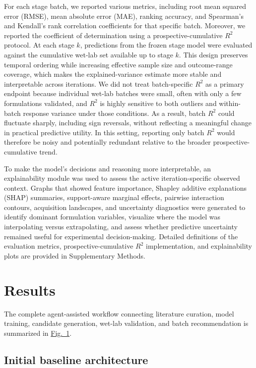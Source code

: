 \documentclass[11pt]{article}
\newcommand{\figref}[2][]{\hyperref[fig:#2]{Fig.~#2#1}}
\begin{document}
For each stage batch, we reported various metrics, including root mean squared error (RMSE), mean absolute error (MAE), ranking accuracy, and Spearman's and Kendall's rank correlation coefficients for that specific batch. Moreover, we reported the coefficient of determination using a prospective-cumulative $R^2$ protocol. At each stage $k$, predictions from the frozen stage model were evaluated against the cumulative wet-lab set available up to stage $k$. This design preserves temporal ordering while increasing effective sample size and outcome-range coverage, which makes the explained-variance estimate more stable and interpretable across iterations. We did not treat batch-specific $R^2$ as a primary endpoint because individual wet-lab batches were small, often with only a few formulations validated, and $R^2$ is highly sensitive to both outliers and within-batch response variance under those conditions. As a result, batch $R^2$ could fluctuate sharply, including sign reversals, without reflecting a meaningful change in practical predictive utility. In this setting, reporting only batch $R^2$ would therefore be noisy and potentially redundant relative to the broader prospective-cumulative trend.

To make the model's decisions and reasoning more interpretable, an explainability module was used to assess the active iteration-specific observed context. Graphs that showed feature importance, Shapley additive explanations (SHAP) summaries, support-aware marginal effects, pairwise interaction contours, acquisition landscapes, and uncertainty diagnostics were generated to identify dominant formulation variables, visualize where the model was interpolating versus extrapolating, and assess whether predictive uncertainty remained useful for experimental decision-making. Detailed definitions of the evaluation metrics, prospective-cumulative $R^2$ implementation, and explainability plots are provided in Supplementary Methods.

\section{Results}

The complete agent-assisted workflow connecting literature curation, model training, candidate generation, wet-lab validation, and batch recommendation is summarized in \figref{1}.

\subsection{Initial baseline architecture}
\end{document}
